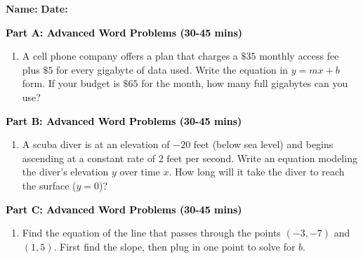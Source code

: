 \documentclass[12pt, letterpaper, fleqn]{article}
\begin{document}
\textbf{Name:} \underline{\hspace{5cm}}
\hfill
\textbf{Date:} \underline{\hspace{3cm}}\\


\begin{tcolorbox}[colback=customteal!20]
\large\textcolor{black}{\textbf{Part A: Advanced Word Problems (30-45 mins)}}
\end{tcolorbox}

\vspace{3mm}

\begin{enumerate}[itemsep=5.5cm, leftmargin=0.6cm]
\item A cell phone company offers a plan that charges a $\$35$ monthly access fee plus $\$5$ for every gigabyte of data used. Write the equation in $y=mx+b$ form. If your budget is $\$65$ for the month, how many full gigabytes can you use?
\end{enumerate}

\newpage

\begin{tcolorbox}[colback=customteal!20]
\large\textcolor{black}{\textbf{Part B: Advanced Word Problems (30-45 mins)}}
\end{tcolorbox}

\vspace{3mm}

\begin{enumerate}[itemsep=5.5cm, leftmargin=0.6cm, resume]
\item A scuba diver is at an elevation of $-20\text{ feet}$ (below sea level) and begins ascending at a constant rate of $2\text{ feet}$ per second. Write an equation modeling the diver's elevation $y$ over time $x$. How long will it take the diver to reach the surface ($y=0$)?
\end{enumerate}

\newpage

\begin{tcolorbox}[colback=customteal!20]
\large\textcolor{black}{\textbf{Part C: Advanced Word Problems (30-45 mins)}}
\end{tcolorbox}

\vspace{3mm}

\begin{enumerate}[itemsep=5.5cm, leftmargin=0.6cm, resume]
\item Find the equation of the line that passes through the points $(-3, -7)$ and $(1, 5)$. First find the slope, then plug in one point to solve for $b$.
\end{enumerate}
\end{document}
